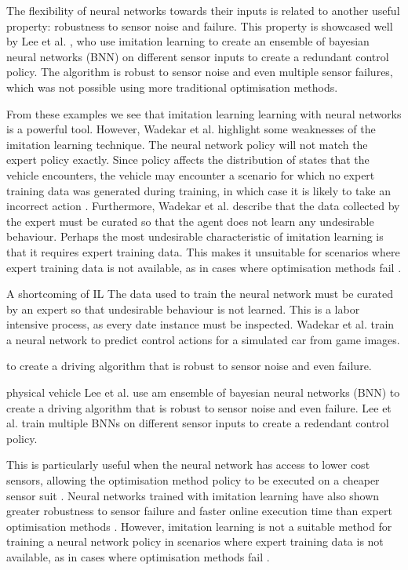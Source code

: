 The flexibility of neural networks towards their inputs is related to another useful property: robustness to sensor noise and failure. 
This property is showcased well by Lee et al. \cite{Lee2019}, who use imitation learning to create an ensemble of bayesian neural networks (BNN) on different sensor inputs to create a redundant control policy. 
The algorithm is robust to sensor noise and even multiple sensor failures, which was not possible using more traditional optimisation methods.

From these examples we see that imitation learning learning with neural networks is a powerful tool.
However, Wadekar et al. \cite{Wadekar2021} highlight some weaknesses of the imitation learning technique.
The neural network policy will not match the expert policy exactly. 
Since policy affects the distribution of states that the vehicle encounters, the vehicle may encounter a scenario for which no expert training data was generated during training, in which case it is likely to take an incorrect action \cite{Osa_2018}.
Furthermore, Wadekar et al. \cite{Wadekar2021} describe that the data collected by the expert must be curated so that the agent does not learn any undesirable behaviour.
Perhaps the most undesirable characteristic of imitation learning is that it requires expert training data.
This makes it unsuitable for scenarios where expert training data is not available, as in cases where optimisation methods fail \cite{Fuchs2021a}.



\cite{Wadekar2021} 
A shortcoming of IL The data used to train the neural network must be curated by an expert so that undesirable behaviour is not learned.
This is a labor intensive process, as every date instance must be inspected.
Wadekar et al. \cite{Wadekar2021} train a neural network to predict control actions for a simulated car from game images.

to create a driving algorithm that is robust to sensor noise and even failure.

\cite{Lee2019} physical vehicle
Lee et al. \cite{Lee2019} use am ensemble of bayesian neural networks (BNN) to create a driving algorithm that is robust to sensor noise and even failure.
Lee et al. \cite{Lee2019} train multiple BNNs on different sensor inputs to create a redendant control policy.

This is particularly useful when the neural network has access to lower cost sensors, allowing the optimisation method policy to be executed on a cheaper sensor suit \cite{Pan2017}. 
Neural networks trained with imitation learning have also shown greater robustness to sensor failure and faster online execution time \cite{Wadekar2021} than expert optimisation methods \cite{Lee2019}. 
However, imitation learning is not a suitable method for training a neural network policy in scenarios where expert training data is not available, as in cases where optimisation methods fail \cite{Fuchs2021a}.

